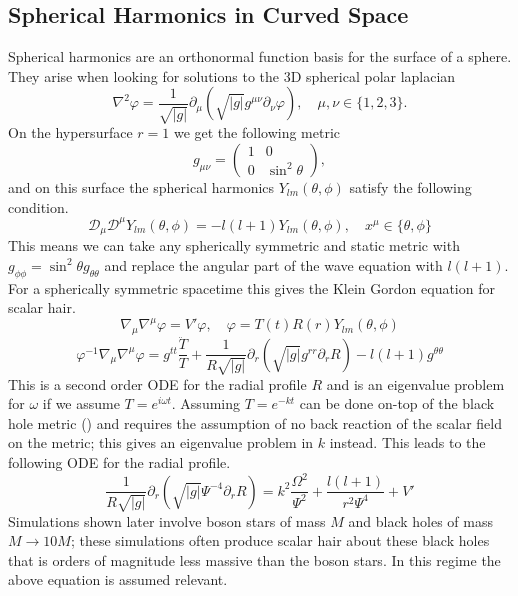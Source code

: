 \documentclass[11pt, oneside]{report}  %
\newcommand{\D}{\mathcal{D}}
\newcommand{\vp}{\varphi}
\numberwithin{equation}{section}
\begin{document}
 \subsection{Spherical Harmonics in Curved Space}
 Spherical harmonics are an orthonormal function basis for the surface of a sphere. They arise when looking for solutions to the 3D spherical polar laplacian
 \begin{equation} \nabla^2 \vp= \frac{1}{\sqrt{|g|}}\partial_{\mu}\left( \sqrt{|g|}g^{\mu\nu}\partial_\nu \vp\right), \quad \mu,\nu \in \{1,2,3\} .\end{equation}
 On the hypersurface $r=1$ we get the following metric
 \begin{equation} g_{\mu\nu} = \begin{pmatrix} 1 & 0 \\ 0 & \sin^2 \theta\end{pmatrix},\end{equation}
 and on this surface the spherical harmonics $Y_{lm}(\theta,\phi)$ satisfy the following condition.
 \begin{equation} \D_\mu \D^\mu Y_{lm}(\theta,\phi) = -l(l+1)Y_{lm}(\theta,\phi), \quad x^\mu \in \{\theta,\phi\}\end{equation} 
 This means we can take any spherically symmetric and static metric with $g_{\phi\phi} = \sin^2\theta g_{\theta\theta}$ and replace the angular part of the wave equation with $l(l+1)$. For a spherically symmetric spacetime this gives the Klein Gordon equation for scalar hair.
 \begin{equation} \nabla_\mu \nabla^\mu \vp = V' \vp, \quad \vp = T(t)R(r)Y_{lm}(\theta,\phi)\end{equation}
 \begin{equation}\vp^{-1}\nabla_\mu \nabla^\mu \vp = g^{tt}\frac{\ddot{T}}{T} +  \frac{1}{R\sqrt{|g|}}\partial_{r}\left( \sqrt{|g|}g^{rr}\partial_r R\right) -{l(l+1)}g^{\theta\theta} \end{equation}
 This is a second order ODE for the radial profile $R$ and is an eigenvalue problem for $\omega$ if we assume $T=e^{i\omega t}$. Assuming $T=e^{-kt}$ can be done on-top of the black hole metric () and requires the assumption of no back reaction of the scalar field on the metric; this gives an eigenvalue problem in $k$ instead. This leads to the following ODE for the radial profile. 
 \begin{equation} \frac{1}{R\sqrt{|g|}}\partial_{r}\left( \sqrt{|g|}\Psi^{-4}\partial_r R\right)  = k^2 \frac{\Omega^2}{\Psi^2} + \frac{l(l+1)}{r^2 \Psi^4} + V'\end{equation}
Simulations shown later involve boson stars of mass $M$ and black holes of mass $M\rightarrow 10M$; these simulations often produce scalar hair about these black holes that is orders of magnitude less massive than the boson stars. In this regime the above equation is assumed relevant.
\end{document}
